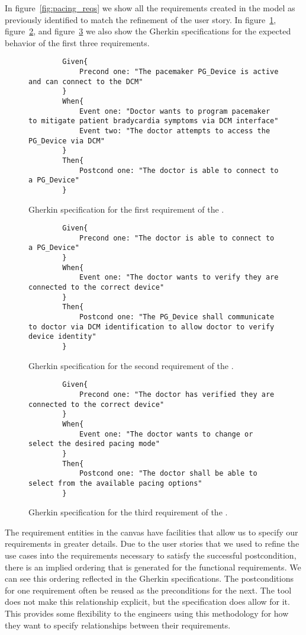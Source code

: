 In figure~\ref{fig:pacing_reqs} we show all the requirements created in the model as previously identified to match the refinement of the user story. In figure~\ref{fig:req1_spec}, figure~\ref{fig:req2_spec}, and figure~\ref{fig:req3_spec} we also show the Gherkin specifications for the expected behavior of the first three requirements.

\begin{figure}
	\begin{lstlisting}
		Given{
			Precond one: "The pacemaker PG_Device is active and can connect to the DCM"
		}
		When{
			Event one: "Doctor wants to program pacemaker to mitigate patient bradycardia symptoms via DCM interface"
			Event two: "The doctor attempts to access the PG_Device via DCM"
		}
		Then{
			Postcond one: "The doctor is able to connect to a PG_Device"
		}
	\end{lstlisting}
	\caption{Gherkin specification for the first requirement of the \pgd.}
	\label{fig:req1_spec}
\end{figure}

\begin{figure}
	\begin{lstlisting}
		Given{
			Precond one: "The doctor is able to connect to a PG_Device"
		}
		When{
			Event one: "The doctor wants to verify they are connected to the correct device"
		}
		Then{
			Postcond one: "The PG_Device shall communicate to doctor via DCM identification to allow doctor to verify device identity"
		}
	\end{lstlisting}
	\caption{Gherkin specification for the second requirement of the \pgd.}
	\label{fig:req2_spec}
\end{figure}

\begin{figure}
	\begin{lstlisting}
		Given{
			Precond one: "The doctor has verified they are connected to the correct device"
		}
		When{
			Event one: "The doctor wants to change or select the desired pacing mode"
		}
		Then{
			Postcond one: "The doctor shall be able to select from the available pacing options"
		}
	\end{lstlisting}
	\caption{Gherkin specification for the third requirement of the \pgd.}
	\label{fig:req3_spec}
\end{figure}

The requirement entities in the canvas have facilities that allow us to specify our requirements in greater details. Due to the user stories that we used to refine the use cases into the requirements necessary to satisfy the successful postcondition, there is an implied ordering that is generated for the functional requirements. We can see this ordering reflected in the Gherkin specifications. The postconditions for one requirement often be reused as the preconditions for the next. The tool does not make this relationship explicit, but the specification does allow for it. This provides some flexibility to the engineers using this methodology for how they want to specify relationships between their requirements. 

